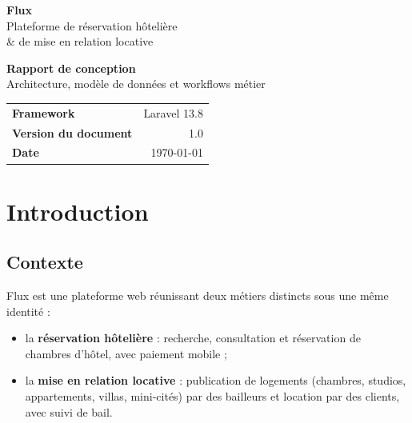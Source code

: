 \documentclass[11pt,a4paper]{report}
\begin{document}
\begin{titlepage}
\centering
\vspace*{2cm}

{\Huge\bfseries\color{fluxbleu} Flux}\\[0.3cm]
{\Large\color{fluxviolet} Plateforme de réservation hôtelière \\ \& de mise en relation locative}\\[2cm]


\vspace{2cm}
{\LARGE\bfseries Rapport de conception}\\[0.5cm]
{\large Architecture, modèle de données et workflows métier}

\vfill

\begin{tabularx}{0.7\textwidth}{Xr}
\textbf{Framework} & Laravel 13.8 \\
\textbf{Version du document} & 1.0 \\
\textbf{Date} & \today \\
\end{tabularx}

\vspace{1cm}
\end{titlepage}

\tableofcontents
\clearpage

\chapter{Introduction}

\section{Contexte}
Flux est une plateforme web réunissant deux métiers distincts sous une même identité :
\begin{itemize}[leftmargin=1.2cm]
    \item la \textbf{réservation hôtelière} : recherche, consultation et réservation de chambres d'hôtel, avec paiement mobile ;
    \item la \textbf{mise en relation locative} : publication de logements (chambres, studios, appartements, villas, mini-cités) par des bailleurs et location par des clients, avec suivi de bail.
\end{itemize}
\end{document}
